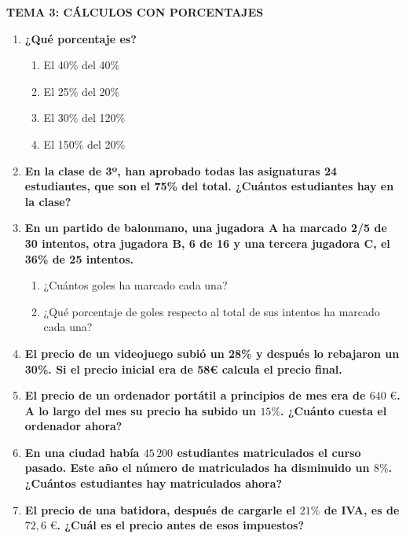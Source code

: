 \documentclass[a4paper,12pt]{article}
\begin{document}
\vspace{0.5cm}

\begin{center}
    \Large\textbf{\color{primary} TEMA 3: CÁLCULOS CON PORCENTAJES}
\end{center}

\begin{enumerate}
    \item \textbf{¿Qué porcentaje es?}
        \begin{enumerate}[label=\alph*)]
            \item El 40\% del 40\%
            \item El 25\% del 20\%
            \item El 30\% del 120\%
            \item El 150\% del 20\%
        \end{enumerate}

    \item \textbf{En la clase de 3º, han aprobado todas las asignaturas 24 estudiantes, que son el 75\% del total. ¿Cuántos estudiantes hay en la clase?}

    \item \textbf{En un partido de balonmano, una jugadora A ha marcado 2/5 de 30 intentos, otra jugadora B, 6 de 16 y una tercera jugadora C, el 36\% de 25 intentos.}
        \begin{enumerate}[label=\alph*)]
            \item ¿Cuántos goles ha marcado cada una?
            \item ¿Qué porcentaje de goles respecto al total de sus intentos ha marcado cada una?
        \end{enumerate}

    \item \textbf{El precio de un videojuego subió un 28\% y después lo rebajaron un 30\%. Si el precio inicial era de 58€ calcula el precio final.}

    \item \textbf{El precio de un ordenador portátil a principios de mes era de $640\text{ €}$. A lo largo del mes su precio ha subido un $15\%$. ¿Cuánto cuesta el ordenador ahora?}

    \item \textbf{En una ciudad había $45\,200$ estudiantes matriculados el curso pasado. Este año el número de matriculados ha disminuido un $8\%$. ¿Cuántos estudiantes hay matriculados ahora?}

    \item \textbf{El precio de una batidora, después de cargarle el $21\%$ de IVA, es de $72{,}6\text{ €}$. ¿Cuál es el precio antes de esos impuestos?}


\end{enumerate}
\end{document}
